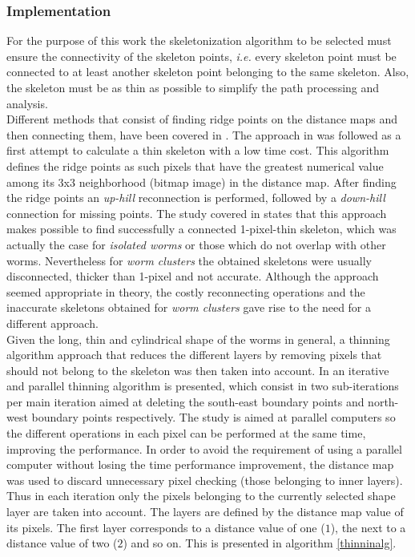 \subsubsection{Implementation}
\label{sec:skeletonimp}

For the purpose of this work the skeletonization algorithm to be selected must
ensure the connectivity of the skeleton points, \emph{i.e.} every skeleton point
must be connected to at least another skeleton point belonging to the same
skeleton. Also, the skeleton must be as thin as possible to simplify the 
path processing and analysis.\\

Different methods that consist of finding ridge points on the distance
maps and then connecting them, have been covered in \cite{maxima,euclideancentre,ridgedt}.
The approach in \cite{maxima} was followed as a first attempt to calculate a thin
skeleton with a low time cost. This algorithm defines the ridge points as such pixels
that have the greatest numerical value among its 3x3 neighborhood (bitmap image) in the 
distance map. After finding the ridge points an \emph{up-hill} reconnection is performed, 
followed by a \emph{down-hill} connection for missing points. The study covered in \cite{maxima}
states that this approach makes possible to find successfully a connected 1-pixel-thin skeleton,
which was actually the case for \emph{isolated worms} or those which do not
overlap with other worms. Nevertheless for \emph{worm clusters} the obtained skeletons
were usually disconnected, thicker than 1-pixel and not accurate. Although the approach
seemed appropriate in theory, the costly reconnecting operations and the inaccurate
skeletons obtained for \emph{worm clusters} gave rise to the need for a different
approach.\\

Given the long, thin and cylindrical shape of the worms in general, a thinning algorithm
approach that reduces the different layers by removing pixels that should not 
belong to the skeleton was then taken into account. In \cite{thinning} an iterative and 
parallel thinning algorithm is presented, which consist in two sub-iterations per main 
iteration aimed at deleting the south-east boundary points and north-west boundary points 
respectively. The study is aimed at parallel computers so the different operations
in each pixel can be performed at the same time, improving the performance. In order
to avoid the requirement of using a parallel computer without losing the time performance 
improvement, the distance map was used to discard unnecessary pixel checking (those
belonging to inner layers). Thus in each iteration only the pixels belonging to the
currently selected shape layer are taken into account. The layers are defined by the
distance map value of its pixels. The first layer corresponds to a distance value
of one ($1$), the next to a distance value of two ($2$) and so on. This is presented in
algorithm \ref{thinninalg}.\\


